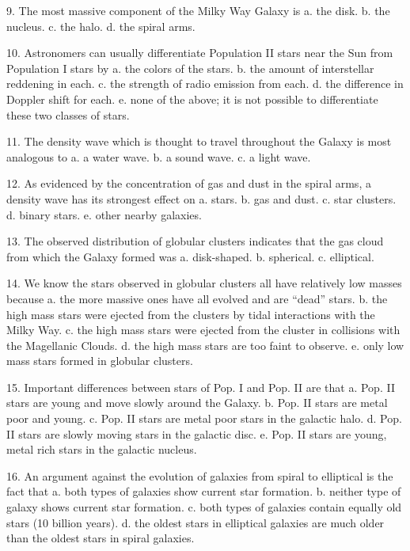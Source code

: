    9. The most massive component of the Milky Way Galaxy is
      a.  the disk.
      b.  the nucleus.
      c.  the halo.
      d.  the spiral arms.
      
  10. Astronomers can usually differentiate Population II stars near the Sun from Population I stars by
      a.  the colors of the stars.
      b.  the amount of interstellar reddening in each.
      c.  the strength of radio emission from each.
      d.  the difference in Doppler shift for each.
      e.  none of the above; it is not possible to differentiate these two classes of stars.
      
  11. The density wave which is thought to travel throughout the Galaxy is most analogous to
      a.  a water wave.
      b.  a sound wave.
      c.  a light wave.
       
  12. As evidenced by the concentration of gas and dust in the spiral arms, a density wave has its strongest effect on
      a.  stars.
      b.  gas and dust.
      c.  star clusters.
      d.  binary stars.
      e.  other nearby galaxies.
       
  13. The observed distribution of globular clusters indicates that the gas cloud from which the Galaxy formed was
      a.  disk-shaped.
      b.  spherical.
      c.  elliptical.
 
  14. We know the stars observed in globular clusters all have relatively low masses because
      a.  the more massive ones have all evolved and are ``dead'' stars.
      b.  the high mass stars were ejected from the clusters by tidal interactions with the Milky Way.
      c.  the high mass stars were ejected from the cluster in collisions with the Magellanic Clouds.
      d.  the high mass stars are too faint to observe.
      e.  only low mass stars formed in globular clusters.
      
  15. Important differences between stars of Pop. I and Pop. II are that
      a.  Pop. II stars are young and move slowly around the Galaxy.
      b.  Pop. II stars are metal poor and young.
      c.  Pop. II stars are metal poor stars in the galactic halo.
      d.  Pop. II stars are slowly moving stars in the galactic disc.
      e.  Pop. II stars are young, metal rich stars in the galactic nucleus.
      
  16. An argument against the evolution of galaxies from spiral to elliptical is the fact that
      a.  both types of galaxies show current star formation.
      b.  neither type of galaxy shows current star formation.
      c.  both types of galaxies contain equally old stars (10 billion years).
      d.  the oldest stars in elliptical galaxies are much older than the oldest stars in spiral galaxies.
      
